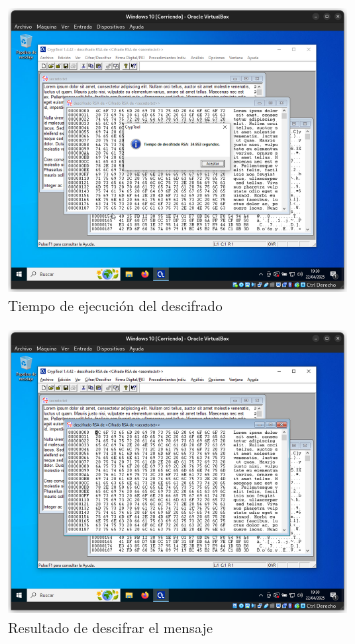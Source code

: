 \begin{figure}[H]
    \centering
    \includegraphics[width=0.8\textwidth]{DesencriptadoRSA-1}
    \caption{Tiempo de ejecución del descifrado}
    \label{fig:RSA-deciph-time}
\end{figure}

\begin{figure}[H]
    \centering
    \includegraphics[width=0.8\textwidth]{DesencriptadoRSA-2}
    \caption{Resultado de descifrar el mensaje}
    \label{fig:RSA-deciph}
\end{figure}
